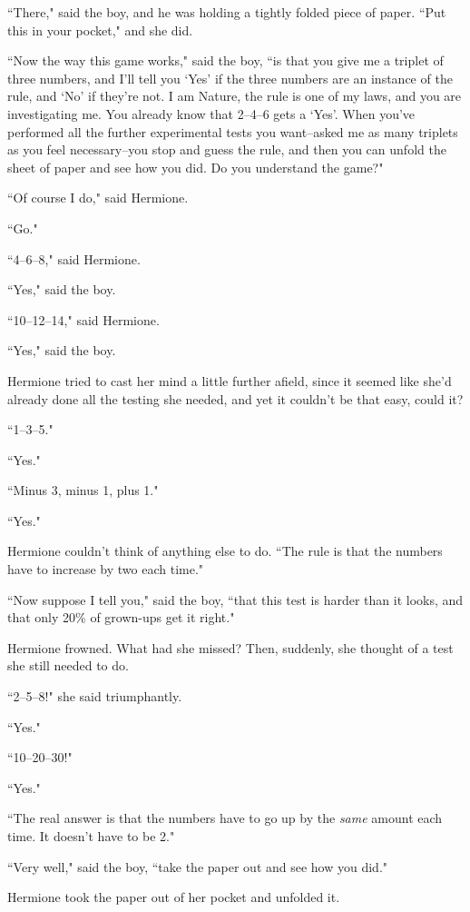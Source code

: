 ``There," said the boy, and he was holding a tightly folded piece of paper. ``Put this in your pocket," and she did.

``Now the way this game works," said the boy, ``is that you give me a triplet of three numbers, and I'll tell you `Yes' if the three numbers are an instance of the rule, and `No' if they're not. I am Nature, the rule is one of my laws, and you are investigating me. You already know that 2--4--6 gets a `Yes'. When you've performed all the further experimental tests you want\---asked me as many triplets as you feel necessary\---you stop and guess the rule, and then you can unfold the sheet of paper and see how you did. Do you understand the game?"

``Of course I do," said Hermione.

``Go."

``4--6--8," said Hermione.

``Yes," said the boy.

``10--12--14," said Hermione.

``Yes," said the boy.

Hermione tried to cast her mind a little further afield, since it seemed like she'd already done all the testing she needed, and yet it couldn't be that easy, could it?

``1--3--5."

``Yes."

``Minus 3, minus 1, plus 1."

``Yes."

Hermione couldn't think of anything else to do. ``The rule is that the numbers have to increase by two each time."

``Now suppose I tell you," said the boy, ``that this test is harder than it looks, and that only 20\% of grown-ups get it right."

Hermione frowned. What had she missed? Then, suddenly, she thought of a test she still needed to do.

``2--5--8!" she said triumphantly.

``Yes."

``10--20--30!"

``Yes."

``The real answer is that the numbers have to go up by the \emph{same} amount each time. It doesn't have to be 2."

``Very well," said the boy, ``take the paper out and see how you did."

Hermione took the paper out of her pocket and unfolded it.

